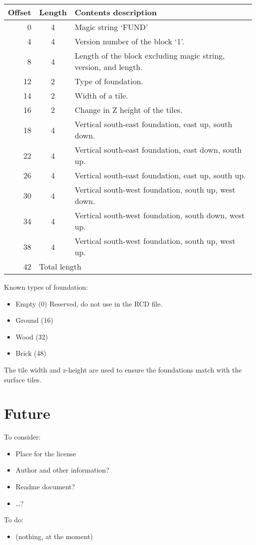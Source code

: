 \documentclass{article}
\begin{document}
\begin{center}
\begin{tabular}{|r|c|l|} \hline
\textbf{Offset} & \textbf{Length} & \textbf{Contents description} \\ \hline
  0 &  4 & Magic string `FUND' \\
  4 &  4 & Version number of the block `1'. \\
  8 &  4 & Length of the block excluding magic string, version, and length. \\
 12 &  2 & Type of foundation. \\
 14 &  2 & Width of a tile. \\
 16 &  2 & Change in Z height of the tiles. \\
 18 &  4 & Vertical south-east foundation, east up, south down. \\
 22 &  4 & Vertical south-east foundation, east down, south up. \\
 26 &  4 & Vertical south-east foundation, east up, south up. \\
 30 &  4 & Vertical south-west foundation, south up, west down. \\
 34 &  4 & Vertical south-west foundation, south down, west up. \\
 38 &  4 & Vertical south-west foundation, south up, west up. \\ \hline
 42 & \multicolumn{2}{l|}{Total length} \\ \hline
\end{tabular}
\end{center}

Known types of foundation:
\begin{itemize}
\item Empty (0) Reserved, do not use in the RCD{} file.
\item Ground (16)
\item Wood (32)
\item Brick (48)
\end{itemize}

The tile width and z-height are used to ensure the foundations match with the
surface tiles.

\newpage
\section{Future}

To consider:
\begin{itemize}
\item Place for the license
\item Author and other information?
\item Readme document?
\item \ldots?
\end{itemize}

To do:
\begin{itemize}
\item (nothing, at the moment)
\end{itemize}
\end{document}
